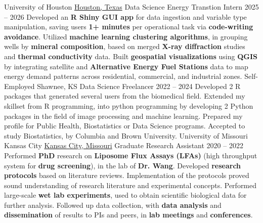 \documentclass[9pt]{adeckcv} %
\begin{document}

\begin{entrylist}
    \entry
        {\large{University of Houston}} 
        {\href{https://www.google.com/maps/search/?api=1\&query=29.7215903,-95.34365}{Houston, Texas}}
        {\large{Data Science Energy Transtion Intern}}
        {2025 -- 2026}
        {\itemizeexperience
        {Developed an \textbf{R Shiny GUI app} for data ingestion and variable type manipulation, saving users \textbf{1+ minutes} per operational task via \textbf{code-writing avoidance}.}
        {Utilized \textbf{machine learning clustering algorithms}, in grouping wells by \textbf{mineral composition}, based on merged \textbf{X-ray diffraction} studies and \textbf{thermal conductivity} data.}
        {Built \textbf{geospatial visualizations} using \textbf{QGIS} by integrating satellite and \textbf{Alternative Energy Fuel Stations} data to map energy demand patterns across residential, commercial, and industrial zones.}
\faWindows\slashsep 
\faLinux\slashsep
\faApple{}\slashsep
{}\slashsep
\faPython{}\slashsep
}
\entry
{\large{Self-Employed}}
{Shawnee, KS}
{\large{Data Science Freelancer}}
{2022 -- 2024}
{\itemizeexperience
  {Developed 2 R packages that generated several users from the biomedical field.}
  {Extended my skillset from R programming, into python programming by developing 2 Python packages in the field of image processing and machine learning.}
  {Prepared my profile for Public Health, Biostatistics or Data Science programs. Accepted to study Biostatistics, by Columbia and Brown University.}
  \faAmazon\slashsep
  \faWarehouse\slashsep
  \faBox{}\slashsep
  \faDolly{}\slashsep
  \faTruck{}
}
\entry
{\large{University of Missouri Kansas City}}
{\href{https://www.google.com/maps/search/?api=1\&query=39.0349318,-94.5745504}{Kansas City, Missouri}}
{\large{Graduate Research Assistant}}
{2020 -- 2022}
{\itemizeexperience
  {Performed \textbf{PhD} research on \textbf{Liposome Flux Assays (LFAs)} (high throughput system for \textbf{drug screening}), in the lab of \textbf{Dr. Wang}.}
  {Developed \textbf{research protocols} based on literature reviews. Implementation of the protocols proved sound understanding of research literature and experimental concepts.}
  {Performed large-scale \textbf{wet lab experiments}, used to obtain scientific biological data for further analysis. Followed up data collection, with \textbf{data analysis} and \textbf{dissemination} of results to PIs and peers, in \textbf{lab meetings} and \textbf{conferences}.}
  \faDna\slashsep
  \faFlask{}\slashsep
  \faPills{}\slashsep
  \faSlideshare
}
\end{entrylist}
\end{document}
